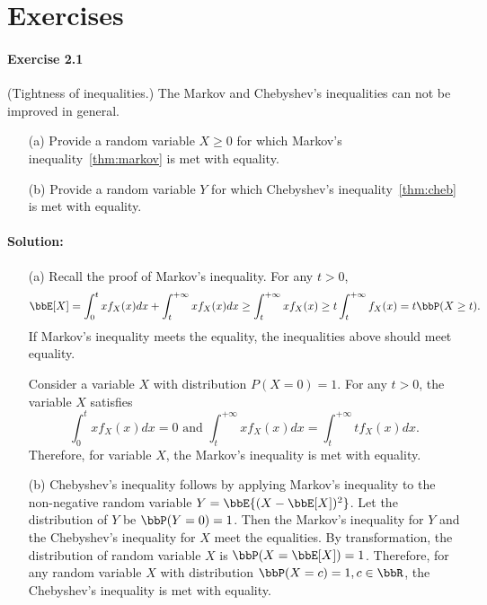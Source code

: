 \documentclass[11pt]{article}
\theoremstyle{plain}
\theoremstyle{definition}
\begin{document}
\section{Exercises}

\paragraph{Exercise 2.1} (Tightness of inequalities.) The Markov and Chebyshev's inequalities can not be improved in general. 
\begin{enumerate}
	\item[(a)] Provide a random variable $X \geq 0$ for which Markov's inequality~\eqref{thm:markov} is met with equality.  
	\item[(b)] Provide a random variable $Y$ for which Chebyshev's inequality~\eqref{thm:cheb} is met with equality.  
\end{enumerate}

\paragraph{Solution:} 
\begin{enumerate}
	\item[(a)] Recall the proof of Markov's inequality. For any $t >0$,
	\[ \bbE[X] = \int_{0}^t x f_X(x) dx + \int_{t}^{+\infty} x f_X(x) dx \geq \int_{t}^{+\infty} x f_X(x)\geq t \int_{t}^{+\infty} f_X(x) = t \bbP( X \geq t).\]
	 If Markov's inequality meets the equality, the inequalities above should meet equality. 
	 
	 Consider a variable $X$ with distribution $P(X = 0) = 1$. For any $t > 0$, the variable $X$ satisfies 
	 \[ \int_{0}^t x f_X(x) dx = 0 \text{ and } \int_{t}^{+\infty} x f_X(x) dx =\int_{t}^{+\infty} t f_X(x) dx. \]
	 Therefore, for variable $X$, the Markov's inequality is met with equality.
	 \item[(b)] Chebyshev's inequality follows by applying Markov's inequality to the non-negative random variable $Y = \bbE{(X - \bbE[X])^2}$. Let the distribution of $Y$ be $\bbP(Y = 0) = 1$. Then the Markov's inequality for $Y$ and the Chebyshev's inequality for $X$ meet the equalities. By transformation, the distribution of random variable $X$ is $\bbP(X = \bbE[X]) = 1$. Therefore, for any random variable $X$ with distribution $\bbP(X = c) = 1, c \in \bbR$, the Chebyshev's inequality is met with equality.
\end{enumerate}
\end{document}
